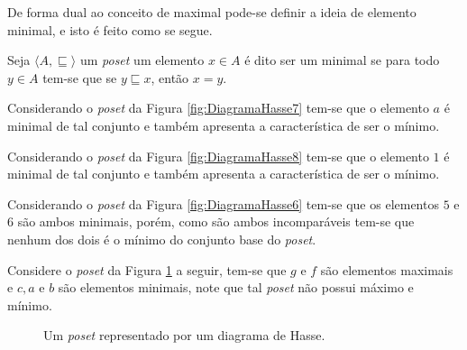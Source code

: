 De forma dual ao conceito de maximal pode-se definir a ideia de elemento minimal, e isto é feito como se segue.

\begin{definition}\label{def:MinimalPoset}
	Seja $\langle A, \sqsubseteq \rangle$ um \textit{poset}  um elemento $x \in A$ é dito ser um minimal se para todo $y \in A$ tem-se que se $y\sqsubseteq x$, então $x = y$.
\end{definition}

\begin{example}
	Considerando o \textit{poset} da Figura \ref{fig:DiagramaHasse7} tem-se que o elemento $a$ é minimal de tal conjunto e também apresenta a característica de ser o mínimo.
\end{example}

\begin{example}
	Considerando o \textit{poset} da Figura \ref{fig:DiagramaHasse8} tem-se que o elemento $1$ é minimal de tal conjunto e também apresenta a característica de ser o mínimo.
\end{example}

\begin{example}
	Considerando o \textit{poset} da Figura \ref{fig:DiagramaHasse6} tem-se que os elementos $5$ e $6$ são ambos minimais, porém, como são ambos incomparáveis tem-se que nenhum dos dois é o mínimo do conjunto base do \textit{poset}.
\end{example}

\begin{example}
	Considere o \textit{poset} da Figura \ref{fig:DiagramaHasse9} a seguir, tem-se que $g$ e $f$ são elementos maximais e $c, a$ e $b$ são elementos minimais, note que tal \textit{poset} não possui máximo e mínimo.
	
	\begin{figure}[h]
		\centering
		\caption{Um \textit{poset} representado por um diagrama de Hasse.}
		\label{fig:DiagramaHasse9}
	\end{figure}
\end{example}

